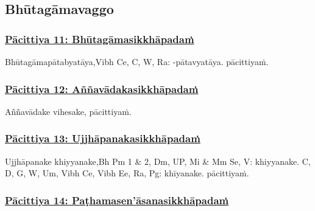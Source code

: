 \subsection{Bhūtagāmavaggo}

\subsubsection*{\hyperref[exp11]{Pācittiya 11: Bhūtagāmasikkhāpadaṁ}}
\label{pac11}

Bhūtagāmapātabyatāya,\makeatletter\hyperlink{endnote-appendix}\makeatother Vibh Ce, C, W, Ra: -pātavyatāya. pācittiyaṁ.



\subsubsection*{\hyperref[exp12]{Pācittiya 12: Aññavādakasikkhāpadaṁ}}
\label{pac12}

Aññavādake vihesake, pācittiyaṁ.



\subsubsection*{\hyperref[exp13]{Pācittiya 13: Ujjhāpanakasikkhāpadaṁ}}
\label{pac13}

Ujjhāpanake khiyyanake,\makeatletter\hyperlink{endnote-appendix}\makeatother Bh Pm 1 & 2, Dm, UP, Mi & Mm Se, V: khiyyanake. C, D, G, W, Um, Vibh Ce, Vibh Ee, Ra, Pg: khīyanake. pācittiyaṁ.



\subsubsection*{\hyperref[exp14]{Pācittiya 14: Paṭhamasen'āsanasikkhāpadaṁ}}
\label{pac14}

